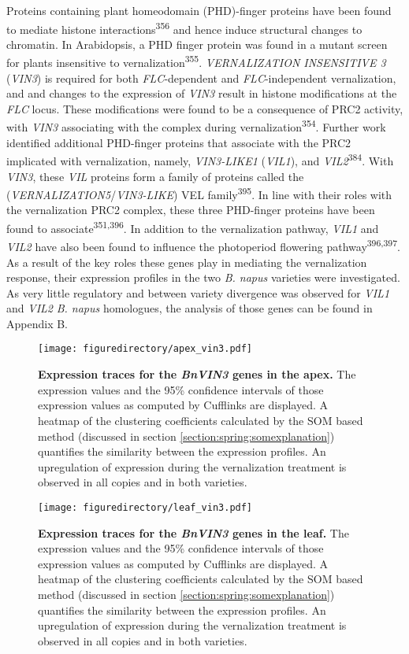 \documentclass[12pt,]{book}
\begin{document}
Proteins containing plant homeodomain (PHD)-finger proteins have been
found to mediate histone interactions\textsuperscript{356} and hence
induce structural changes to chromatin. In Arabidopsis, a PHD finger
protein was found in a mutant screen for plants insensitive to
vernalization\textsuperscript{355}. \emph{VERNALIZATION INSENSITIVE 3}
(\emph{VIN3}) is required for both \emph{FLC}-dependent and
\emph{FLC}-independent vernalization, and and changes to the expression
of \emph{VIN3} result in histone modifications at the \emph{FLC} locus.
These modifications were found to be a consequence of PRC2 activity,
with \emph{VIN3} associating with the complex during
vernalization\textsuperscript{354}. Further work identified additional
PHD-finger proteins that associate with the PRC2 implicated with
vernalization, namely, \emph{VIN3-LIKE1} (\emph{VIL1}), and
\emph{VIL2}\textsuperscript{384}. With \emph{VIN3}, these \emph{VIL}
proteins form a family of proteins called the
(\emph{VERNALIZATION5}/\emph{VIN3-LIKE}) VEL
family\textsuperscript{395}. In line with their roles with the
vernalization PRC2 complex, these three PHD-finger proteins have been
found to associate\textsuperscript{351,396}. In addition to the
vernalization pathway, \emph{VIL1} and \emph{VIL2} have also been found
to influence the photoperiod flowering pathway\textsuperscript{396,397}.
As a result of the key roles these genes play in mediating the
vernalization response, their expression profiles in the two \emph{B.
napus} varieties were investigated. As very little regulatory and
between variety divergence was observed for \emph{VIL1} and \emph{VIL2}
\emph{B. napus} homologues, the analysis of those genes can be found in
Appendix B.

\begin{figure}[htbp]
\centering
\texttt{[image: figuredirectory/apex\_vin3.pdf]}
\caption{\textbf{Expression traces for the \emph{BnVIN3} genes in the
apex.} The expression values and the 95\% confidence intervals of those
expression values as computed by Cufflinks are displayed. A heatmap of
the clustering coefficients calculated by the SOM based method
(discussed in section \ref{section:spring:somexplanation}) quantifies
the similarity between the expression profiles. An upregulation of
expression during the vernalization treatment is observed in all copies
and in both varieties.}\label{figure:3xx:vin3apex}
\end{figure}

\begin{figure}[htbp]
\centering
\texttt{[image: figuredirectory/leaf\_vin3.pdf]}
\caption{\textbf{Expression traces for the \emph{BnVIN3} genes in the
leaf.} The expression values and the 95\% confidence intervals of those
expression values as computed by Cufflinks are displayed. A heatmap of
the clustering coefficients calculated by the SOM based method
(discussed in section \ref{section:spring:somexplanation}) quantifies
the similarity between the expression profiles. An upregulation of
expression during the vernalization treatment is observed in all copies
and in both varieties.}\label{figure:3xx:vin3leaf}
\end{figure}
\end{document}
